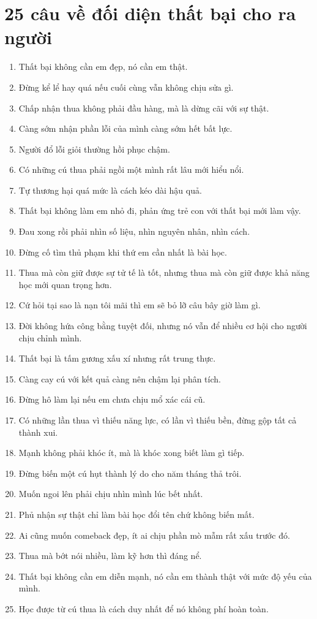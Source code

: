 \section{25 câu về đối diện thất bại cho ra người}
\begin{enumerate}[leftmargin=*,resume]
\item Thất bại không cần em đẹp, nó cần em thật.
\item Đừng kể lể hay quá nếu cuối cùng vẫn không chịu sửa gì.
\item Chấp nhận thua không phải đầu hàng, mà là dừng cãi với sự thật.
\item Càng sớm nhận phần lỗi của mình càng sớm hết bất lực.
\item Người đổ lỗi giỏi thường hồi phục chậm.
\item Có những cú thua phải ngồi một mình rất lâu mới hiểu nổi.
\item Tự thương hại quá mức là cách kéo dài hậu quả.
\item Thất bại không làm em nhỏ đi, phản ứng trẻ con với thất bại mới làm vậy.
\item Đau xong rồi phải nhìn số liệu, nhìn nguyên nhân, nhìn cách.
\item Đừng cố tìm thủ phạm khi thứ em cần nhất là bài học.
\item Thua mà còn giữ được sự tử tế là tốt, nhưng thua mà còn giữ được khả năng học mới quan trọng hơn.
\item Cứ hỏi tại sao là nạn tôi mãi thì em sẽ bỏ lỡ câu bây giờ làm gì.
\item Đời không hứa công bằng tuyệt đối, nhưng nó vẫn để nhiều cơ hội cho người chịu chỉnh mình.
\item Thất bại là tấm gương xấu xí nhưng rất trung thực.
\item Càng cay cú với kết quả càng nên chậm lại phân tích.
\item Đừng hô làm lại nếu em chưa chịu mổ xác cái cũ.
\item Có những lần thua vì thiếu năng lực, có lần vì thiếu bền, đừng gộp tất cả thành xui.
\item Mạnh không phải khóc ít, mà là khóc xong biết làm gì tiếp.
\item Đừng biến một cú hụt thành lý do cho năm tháng thả trôi.
\item Muốn ngoi lên phải chịu nhìn mình lúc bết nhất.
\item Phủ nhận sự thật chỉ làm bài học đổi tên chứ không biến mất.
\item Ai cũng muốn comeback đẹp, ít ai chịu phần mò mẫm rất xấu trước đó.
\item Thua mà bớt nói nhiều, làm kỹ hơn thì đáng nể.
\item Thất bại không cần em diễn mạnh, nó cần em thành thật với mức độ yếu của mình.
\item Học được từ cú thua là cách duy nhất để nó không phí hoàn toàn.
\end{enumerate}

